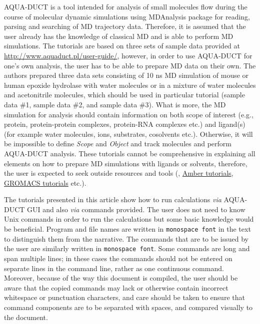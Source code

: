 \documentclass[9pt,tutorial]{livecoms}
\begin{document}
AQUA-DUCT is a tool intended for analysis of small molecules flow during the course of molecular dynamic simulations using MDAnalysis \cite{Michaud-Agrawal2011} package for reading, parsing and searching of MD trajectory data. Therefore, it is assumed that the user already has the knowledge of classical MD and is able to perform MD simulations. The tutorials are based on three sets of sample data provided at  \url{http://www.aquaduct.pl/user-guide/}, however, in order to use  AQUA-DUCT for one’s own analysis, the user has to be able to prepare MD data on their own. The authors prepared three data sets consisting of 10 ns MD simulation of mouse or human epoxide hydrolase with water molecules or in a mixture of water molecules and acetonitrile molecules, which should be used in particular tutorial (sample data \#1, sample data \#2, and sample data \#3). What is more, the MD simulation for analysis should contain information on both scope of interest (e.g., protein, protein-protein complexes, protein-RNA complexes etc.) and ligand(s) (for example water molecules, ions, substrates, cosolvents etc.). Otherwise, it will be impossible to define \textit{Scope} and \textit{Object} and track molecules and perform AQUA-DUCT analysis. These tutorials cannot be comprehensive in explaining all elements on how to prepare MD simulations with ligands or solvents, therefore, the user is expected to seek outside resources and tools (\cite{Mitusinska2020}, \href{https://ambermd.org/tutorials/}{Amber tutorials}, \href{http://www.mdtutorials.com/gmx/}{GROMACS tutorials} etc.). 

The tutorials presented in this article show how to run calculations \textit{via} AQUA-DUCT GUI and also \textit{via} commands provided. The user does not need to know Unix commands in order to run the calculations but some basic knowledge would be beneficial. Program and file names are written in \texttt{monospace font} in the text to distinguish them from the narrative. The commands that are to be issued by the user are similarly written in \texttt{monospace font}. Some commands are long and span multiple lines; in these cases the commands should not be entered on separate lines in the command line, rather as one continuous command. 
Moreover, because of the way this document is compiled, the user should be aware that the copied commands may lack or otherwise contain incorrect whitespace or punctuation characters, and care should be taken to ensure that command components are to be separated with spaces, and compared visually to the document.
\end{document}
